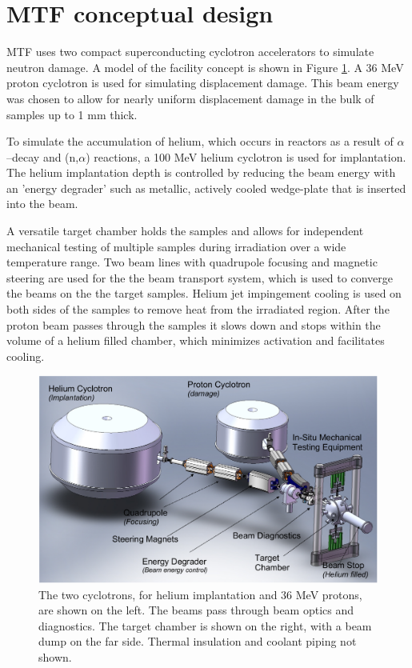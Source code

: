 \documentclass[final,3p,times,twocolumn]{elsarticle} %
\begin{document}
\section{MTF conceptual design}
MTF uses two compact superconducting cyclotron accelerators to simulate neutron damage.  A model of the facility concept is shown in Figure \ref{fig:FacilityOverview}.  A 36 MeV proton cyclotron is used for simulating displacement damage.  This beam energy was chosen to allow for nearly uniform displacement damage in the bulk of samples up to 1 mm thick.

To simulate the accumulation of helium, which occurs in reactors as a result of $\alpha$--decay and (n,$\alpha$) reactions, a 100 MeV helium cyclotron is used for implantation.  The helium implantation depth is controlled by reducing the beam energy with an 'energy degrader' such as metallic, actively cooled wedge-plate that is inserted into the beam.

A versatile target chamber holds the samples and allows for independent mechanical testing of multiple samples during irradiation over a wide temperature range.  Two beam lines with quadrupole focusing and magnetic steering are used for the the beam transport system, which is used to converge the beams on the the target samples.  Helium jet impingement cooling is used on both sides of the samples to remove heat from the irradiated region. After the proton beam passes through the samples it slows down and stops within the volume of a helium filled chamber, which minimizes activation and facilitates cooling.

\begin{figure}[htbp]
\begin{center}
\includegraphics[width=120mm]{Figures/FacilityModel.png}
\caption{The two cyclotrons, for helium implantation and 36 MeV protons, are shown on the left. The beams pass through beam optics and diagnostics. The target chamber is shown on the right, with a beam dump on the far side.  Thermal insulation and coolant piping not shown.}
\label{fig:FacilityOverview}
\end{center}
\end{figure}
\end{document}
